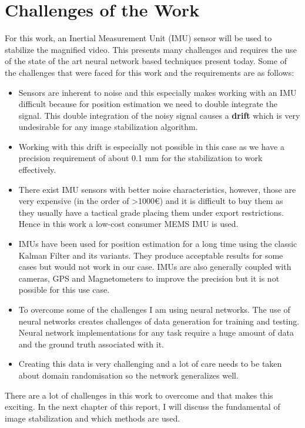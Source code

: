 \section{Challenges of the Work}
For this work, an Inertial Measurement Unit (IMU) sensor will be used to stabilize the magnified video. This presents many challenges and requires the use of the state of the art neural network based techniques present today. Some of the challenges that were faced for this work and the requirements are as follows:

\begin{itemize}
\item Sensors are inherent to noise and this especially makes working with an IMU difficult because for position estimation we need to double integrate the signal. This double integration of the noisy signal causes a \textbf{drift} which is very undesirable for any image stabilization algorithm. 
\item Working with this drift is especially not possible in this case as we have a precision requirement of about 0.1 mm for the stabilization to work effectively.
\item There exist IMU sensors with better noise characteristics, however, those are very expensive (in the order of >1000€) and it is difficult to buy them as they usually have a tactical grade placing them under export restrictions. Hence in this work a low-cost consumer MEMS IMU is used.
\item IMUs have been used for position estimation for a long time using the classic Kalman Filter and its variants. They produce acceptable results for some cases but would not work in our case. IMUs are also generally coupled with cameras, GPS and Magnetometers to improve the precision but it is not possible for this use case.
\item  To overcome some of the challenges I am using neural networks. The use of neural networks creates challenges of data generation for training and testing. Neural network implementations for any task require a huge amount of data and the ground truth associated with it.
\item Creating this data is very challenging and a lot of care needs to be taken about domain randomisation so the network generalizes well.
\end{itemize}

There are a lot of challenges in this work to overcome and that makes this exciting. In the next chapter of this report, I will discuss the fundamental of image stabilization and which methods are used.
